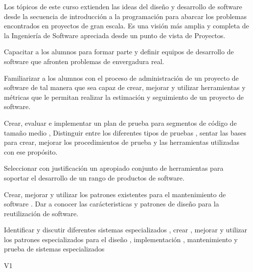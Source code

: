 \begin{syllabus}


\begin{justification}
Los tópicos de este curso extienden las ideas del diseño y desarrollo de software desde la secuencia de introducción a la programación para
abarcar los problemas encontrados en proyectos de gran escala. Es una visión más amplia y completa de la Ingeniería 
de Software apreciada desde un punto de vista de Proyectos.
\end{justification}

\begin{goals}
\item Capacitar a los alumnos para formar parte y definir equipos de desarrollo de software que afronten problemas de envergadura real.
\item Familiarizar a los alumnos con el proceso de administración de un proyecto de software de tal manera que sea capaz de crear, mejorar y utilizar herramientas y métricas que le permitan realizar la estimación y seguimiento de un proyecto de software.
\item Crear, evaluar e implementar un plan de prueba para segmentos de código de tamaño medio  , Distinguir entre los diferentes tipos de pruebas ,  sentar las bases para  crear, mejorar los procedimientos de prueba y las herramientas utilizadas con ese propósito.
\item Seleccionar con justificación un apropiado conjunto de herramientas para soportar el desarrollo de un rango de productos de software.
\item Crear, mejorar y utilizar  los patrones existentes para el mantenimiento de software . Dar a conocer las carácteristicas y patrones de diseño para la reutilización de software.
\item Identificar y discutir diferentes sistemas especializados , crear , mejorar y utilizar los patrones especializados para el diseño , implementación , mantenimiento y prueba   de sistemas especializados
\end{goals}

\begin{outcomes}{V1}
    \item {}
    \item {}
    \item {}
    \item {}
    \item {}
\end{outcomes}


\end{syllabus}
